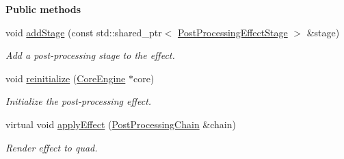 \begin{Indent}\textbf{ Public methods}\par
\begin{DoxyCompactItemize}
\item 
\mbox{\label{classrev_1_1_post_processing_effect_ab0ad07ad568b98b74964f2824f99db2e}} 
void \mbox{\hyperlink{classrev_1_1_post_processing_effect_ab0ad07ad568b98b74964f2824f99db2e}{add\+Stage}} (const std\+::shared\+\_\+ptr$<$ \mbox{\hyperlink{classrev_1_1_post_processing_effect_stage}{Post\+Processing\+Effect\+Stage}} $>$ \&stage)
\begin{DoxyCompactList}\small\item\em Add a post-\/processing stage to the effect. \end{DoxyCompactList}\item 
void \mbox{\hyperlink{classrev_1_1_post_processing_effect_a0100bdd75fdafaa88df96f9dbd4cf760}{reinitialize}} (\mbox{\hyperlink{classrev_1_1_core_engine}{Core\+Engine}} $\ast$core)
\begin{DoxyCompactList}\small\item\em Initialize the post-\/processing effect. \end{DoxyCompactList}\item 
\mbox{\label{classrev_1_1_post_processing_effect_a6e84d39eee209f0727e98b6373d698df}} 
virtual void \mbox{\hyperlink{classrev_1_1_post_processing_effect_a6e84d39eee209f0727e98b6373d698df}{apply\+Effect}} (\mbox{\hyperlink{classrev_1_1_post_processing_chain}{Post\+Processing\+Chain}} \&chain)
\begin{DoxyCompactList}\small\item\em Render effect to quad. \end{DoxyCompactList}\end{DoxyCompactItemize}
\end{Indent}
